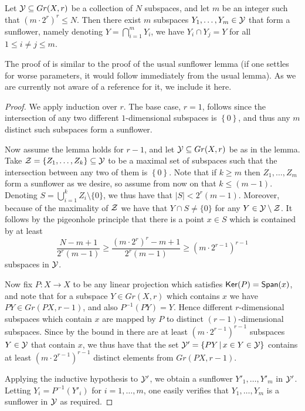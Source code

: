 \documentclass{toc}
\newcommand\card[1]{\left| {#1} \right|}
\newcommand\set[1]{{\left\{ #1 \right\}}}
\newcommand\Set[2]{ \left\{ #1 \,  \vert  \, #2\right\} }
\newcommand\spn{{\sf Span}}
\renewcommand\geq{\geqslant}
\renewcommand\leq{\leqslant}
\renewcommand\le{\leqslant}
\newcommand{\parenth}[1]{\left({#1}\right)}
\begin{document}
\def\Y{{\cal Y}}
\def\Z{{\cal Z}}
\begin{lemma}\label{lemma:sunflower}
  Let $\Y\subseteq Gr(X,r)$ be a collection of $N$ subspaces, and
  let $m$ be
  an integer such that $(m \cdot 2^r)^r \leq N$. Then there exist $m$
  subspaces  $Y_1, \ldots, Y_m\in\Y$ that form a sunflower,
  namely denoting %
  $Y = \bigcap_{i=1}^m Y_i$, %
  we have $Y_i \cap Y_j = Y$ for
  all $1\le i\neq j\le m$. %
\end{lemma}
The proof of  is similar to the proof of the
usual sunflower lemma (if one settles for worse parameters, it would
follow immediately from the usual lemma). As we are currently not aware of a reference
for it, we include it here.
\begin{proof}
  We apply induction over $r$. The base case, $r=1$, follows since the
  intersection of any two different $1$-dimensional %
  subspaces %
  is
  $\set{0}$, and thus any  $m$ distinct such subspaces form a
  sunflower.

Now assume the lemma holds for $r-1$, and let $\Y\subseteq Gr(X,r)$ be
as in the lemma. Take $\Z=\set{Z_1,\ldots,Z_k}\subseteq\Y$ to be a maximal set of
subspaces such that the intersection between any two of them is
$\set{0}$. Note that if $k\geq m$ then $Z_1,\ldots,Z_m$ form a
sunflower as we desire, so assume from now on that $k\leq (m-1)$. Denoting
%
$S=\bigcup_{i=1}^kZ_i\setminus \{0\}$,  %
we thus have that $\card S < 2^r(m-1)$. Moreover, because of the maximality of $\Z$
we have that
%
$Y\cap S\neq \{0\}$
for any $Y\in\Y\setminus\Z$. It follows by
%
the pigeonhole principle
that there
is a point $x\in S$ which is contained by at least
\begin{equation}\label{eq:2}
\frac{N-m+1}{2^r(m-1)}\geq  \frac{(m\cdot 2^r)^r-m+1}{2^r(m-1)} \geq \parenth{m\cdot2^{r-1}}^{r-1}
\end{equation}
subspaces in $\Y$.

Now fix $P:X\to X$ to be any linear projection which satisfies
${\sf Ker}(P)=\spn(x)$, and note that for a subspace $Y\in Gr(X,r)$ which contains $x$ we have
$PY\in Gr(PX,r-1)$, and also
$P^{-1}(PY)=Y$. Hence different $r$-dimensional subspaces which contain $x$ are mapped
by $P$ to distinct $(r-1)$-dimensional subspaces. Since by the
bound in  there are at least
$\parenth{m\cdot2^{r-1}}^{r-1}$ subspaces $Y\in \Y$ that contain $x$,
we thus have that the set $\Y'=\Set{PY}{x\in Y\in \Y}$ contains at
least $\parenth{m\cdot2^{r-1}}^{r-1}$ distinct elements from $Gr(PX,r-1)$.

Applying the inductive hypothesis to $\Y'$, we obtain a sunflower
$Y'_1,\ldots,Y'_m$ in $\Y'$. Letting $Y_i=P^{-1}(Y'_i)$ for
$i=1,\ldots,m$, one easily verifies that $Y_1,\ldots,Y_m$ is a
sunflower in $\Y$ as required.
\end{proof}
\end{document}
